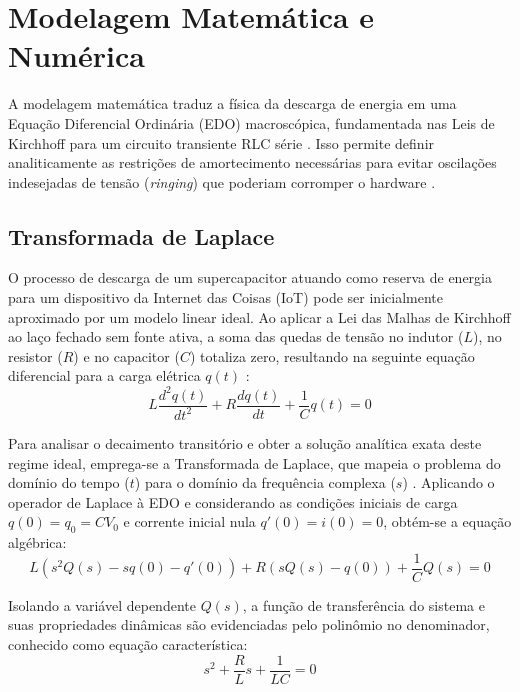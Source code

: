 \documentclass[12pt, a4paper]{article}
\begin{document}
\section{Modelagem Matemática e Numérica}

A modelagem matemática traduz a física da descarga de energia em uma Equação Diferencial Ordinária (EDO) macroscópica, fundamentada nas Leis de Kirchhoff para um circuito transiente RLC série \cite{kafle2025, shaikh2022}. Isso permite definir analiticamente as restrições de amortecimento necessárias para evitar oscilações indesejadas de tensão (\textit{ringing}) que poderiam corromper o hardware \cite{modelagem2026}. 

\subsection{Transformada de Laplace}

O processo de descarga de um supercapacitor atuando como reserva de energia para um dispositivo da Internet das Coisas (IoT) pode ser inicialmente aproximado por um modelo linear ideal. Ao aplicar a Lei das Malhas de Kirchhoff ao laço fechado sem fonte ativa, a soma das quedas de tensão no indutor ($L$), no resistor ($R$) e no capacitor ($C$) totaliza zero, resultando na seguinte equação diferencial para a carga elétrica $q(t)$ \cite{kafle2025, shaikh2022}:
\begin{equation}
    L \frac{d^2q(t)}{dt^2} + R \frac{dq(t)}{dt} + \frac{1}{C} q(t) = 0
\end{equation}

Para analisar o decaimento transitório e obter a solução analítica exata deste regime ideal, emprega-se a Transformada de Laplace, que mapeia o problema do domínio do tempo ($t$) para o domínio da frequência complexa ($s$) \cite{igwe2025}. Aplicando o operador de Laplace à EDO e considerando as condições iniciais de carga $q(0) = q_0 = C V_0$ e corrente inicial nula $q'(0) = i(0) = 0$, obtém-se a equação algébrica:
\begin{equation}
    L \left( s^2 Q(s) - s q(0) - q'(0) \right) + R \left( s Q(s) - q(0) \right) + \frac{1}{C} Q(s) = 0
\end{equation}

Isolando a variável dependente $Q(s)$, a função de transferência do sistema e suas propriedades dinâmicas são evidenciadas pelo polinômio no denominador, conhecido como equação característica:
\begin{equation}
    s^2 + \frac{R}{L} s + \frac{1}{LC} = 0
\end{equation}
\end{document}
